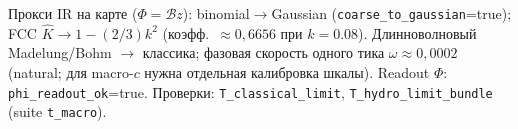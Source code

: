 Прокси IR на карте ($\Phi=\mathcal{B}z$): binomial$\to$Gaussian
(\texttt{coarse\_to\_gaussian}=true); FCC $\hat K\to 1-(2/3)k^2$
(коэфф.\ $\approx0{,}6656$ при $k=0.08$).
Длинноволновый Madelung/Bohm $\to$ классика; фазовая скорость одного тика
$\omega\approx0{,}0002$ (natural; для macro-$c$ нужна отдельная калибровка шкалы).
Readout $\Phi$: \texttt{phi\_readout\_ok}=true.
Проверки: \texttt{T\_classical\_limit}, \texttt{T\_hydro\_limit\_bundle} (suite \texttt{t\_macro}).
